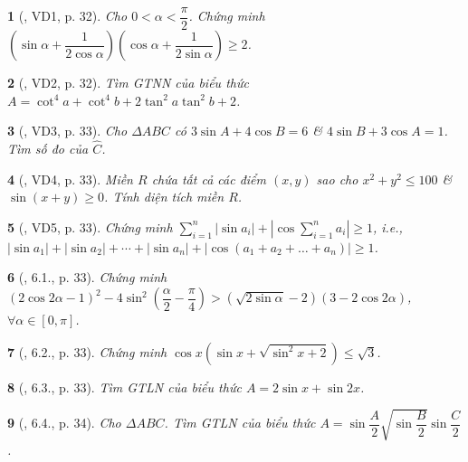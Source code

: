 \documentclass{article}
\newtheorem{baitoan}{}
\begin{document}
\begin{baitoan}[\cite{Hung_nang_cao_phat_trien_Toan_11_tap_1}, VD1, p. 32]
	Cho $0 < \alpha < \dfrac{\pi}{2}$. Chứng minh $\left(\sin\alpha + \dfrac{1}{2\cos\alpha}\right)\left(\cos\alpha + \dfrac{1}{2\sin\alpha}\right)\ge2$.
\end{baitoan}

\begin{baitoan}[\cite{Hung_nang_cao_phat_trien_Toan_11_tap_1}, VD2, p. 32]
	Tìm {\rm GTNN} của biểu thức $A = \cot^4a + \cot^4b + 2\tan^2a\tan^2b + 2$.
\end{baitoan}

\begin{baitoan}[\cite{Hung_nang_cao_phat_trien_Toan_11_tap_1}, VD3, p. 33]
	Cho $\Delta ABC$ có $3\sin A + 4\cos B = 6$ \& $4\sin B + 3\cos A = 1$. Tìm số đo của $\widehat{C}$.
\end{baitoan}

\begin{baitoan}[\cite{Hung_nang_cao_phat_trien_Toan_11_tap_1}, VD4, p. 33]
	Miền $R$ chứa tất cả các điểm $(x,y)$ sao cho $x^2 + y^2\le100$ \& $\sin(x + y)\ge0$. Tính diện tích miền $R$.
\end{baitoan}

\begin{baitoan}[\cite{Hung_nang_cao_phat_trien_Toan_11_tap_1}, VD5, p. 33]
	Chứng minh $\sum_{i=1}^n |\sin a_i| + |\cos\sum_{i=1}^n a_i|\ge1$, i.e., $|\sin a_1| + |\sin a_2| + \cdots + |\sin a_n| + |\cos(a_1 + a_2 + \ldots + a_n)|\ge1$.
\end{baitoan}

\begin{baitoan}[\cite{Hung_nang_cao_phat_trien_Toan_11_tap_1}, 6.1., p. 33]
	Chứng minh $(2\cos2\alpha - 1)^2 - 4\sin^2\left(\dfrac{\alpha}{2} - \dfrac{\pi}{4}\right) > (\sqrt{2\sin\alpha} - 2)(3 - 2\cos2\alpha)$, $\forall\alpha\in[0,\pi]$.
\end{baitoan}

\begin{baitoan}[\cite{Hung_nang_cao_phat_trien_Toan_11_tap_1}, 6.2., p. 33]
	Chứng minh $\cos x(\sin x + \sqrt{\sin^2x + 2})\le\sqrt{3}$.
\end{baitoan}

\begin{baitoan}[\cite{Hung_nang_cao_phat_trien_Toan_11_tap_1}, 6.3., p. 33]
	Tìm {\rm GTLN} của biểu thức $A = 2\sin x + \sin2x$.
\end{baitoan}

\begin{baitoan}[\cite{Hung_nang_cao_phat_trien_Toan_11_tap_1}, 6.4., p. 34]
	Cho $\Delta ABC$. Tìm {\rm GTLN} của biểu thức $A = \sin\dfrac{A}{2}\sqrt{\sin\dfrac{B}{2}}\sin\dfrac{C}{2}$.
\end{baitoan}
\end{document}
